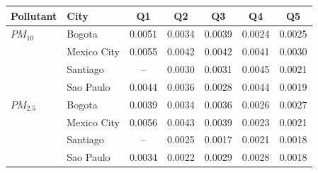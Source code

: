 \begin{tabular}{llccccc}
\toprule
Pollutant & City & Q1 & Q2 & Q3 & Q4 & Q5 \\
\midrule
$PM_{10}$ & Bogota & 0.0051 & 0.0034 & 0.0039 & 0.0024 & 0.0025 \\
 & Mexico City & 0.0055 & 0.0042 & 0.0042 & 0.0041 & 0.0030 \\
 & Santiago & -- & 0.0030 & 0.0031 & 0.0045 & 0.0021 \\
 & Sao Paulo & 0.0044 & 0.0036 & 0.0028 & 0.0044 & 0.0019 \\
\addlinespace
$PM_{2.5}$ & Bogota & 0.0039 & 0.0034 & 0.0036 & 0.0026 & 0.0027 \\
 & Mexico City & 0.0056 & 0.0043 & 0.0039 & 0.0023 & 0.0021 \\
 & Santiago & -- & 0.0025 & 0.0017 & 0.0021 & 0.0018 \\
 & Sao Paulo & 0.0034 & 0.0022 & 0.0029 & 0.0028 & 0.0018 \\
\bottomrule
\end{tabular}
